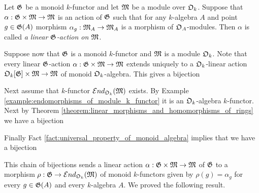 \begin{definition}
Let ${\mathfrak G}$ be a monoid $k$-functor and let ${\mathfrak M}$ be a module over ${\mathfrak O}_k$. Suppose that $\alpha:{\mathfrak G}\times {\mathfrak M}\rightarrow {\mathfrak M}$ is an action of ${\mathfrak G}$ such that for any $k$-algebra $A$ and point $g\in {\mathfrak G}(A)$ morphism $\alpha_{g}:{\mathfrak M}_A\rightarrow {\mathfrak M}_A$ is a morphism of ${\mathfrak O}_A$-modules. Then $\alpha$ is called \textit{a linear ${\mathfrak G}$-action on ${\mathfrak M}$}.
\end{definition}
\noindent
Suppose now that ${\mathfrak G}$ is a monoid $k$-functor and ${\mathfrak M}$ is a module ${\mathfrak O}_k$. Note that every linear ${\mathfrak G}$-action $\alpha:{\mathfrak G}\times {\mathfrak M} \rightarrow {\mathfrak M}$ extends uniquely to a ${\mathfrak O}_k$-linear action ${\mathfrak O}_k[{\mathfrak G}]\times {\mathfrak M}\rightarrow {\mathfrak M}$ of monoid ${\mathfrak O}_k$-algebra. This gives a bijection
\begin{center}
\end{center}
Next assume that $k$-functor ${\mathcal E} nd_{{\mathfrak O}_k}({\mathfrak M})$ exists. By Example \ref{example:endomorphisms_of_module_k_functor} it is an ${\mathfrak O}_k$-algebra $k$-functor. Next by Theorem \ref{theorem:linear_morphisms_and_homomorphisms_of_rings} we have a bijection
\begin{center}
\end{center}
Finally Fact \ref{fact:universal_property_of_monoid_algebra} implies that we have a bijection
\begin{center}
\end{center}
This chain of bijections sends a linear action $\alpha:{\mathfrak G}\times {\mathfrak M}\rightarrow {\mathfrak M}$ of ${\mathfrak G}$ to a morphism $\rho:{\mathfrak G}\rightarrow {\mathcal E} nd_{{\mathfrak O}_k}({\mathfrak M})$ of monoid $k$-functors given by $\rho(g) = \alpha_{g}$ for every $g\in {\mathfrak G}(A)$ and every $k$-algebra $A$. We proved the following result.

